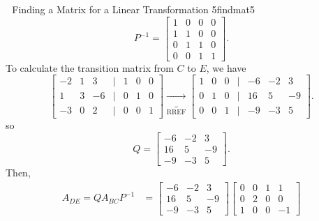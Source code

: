 \begin{example}{\Difficulty\,\Difficulty\,\Difficulty\,\,Finding a Matrix for a Linear Transformation 5}{findmat5}
\begin{equation*}
                P^{-1}=\begin{bmatrix}
                    1 & 0 & 0 & 0 \\
                    1 & 1 & 0 & 0 \\
                    0 & 1 & 1 & 0 \\
                    0 & 0 & 1 & 1
                \end{bmatrix}.
            \end{equation*}
            To calculate the transition matrix from \(C\) to \(E\), we have
            \begin{equation*}
                \begin{bmatrix}
                    -2 & 1 & 3 & | & 1 & 0 & 0 \\
                    1 & 3 & -6 & | & 0 & 1 & 0 \\
                    -3 & 0 & 2 & | & 0 & 0 & 1
                \end{bmatrix}\underbrace{\to}_\text{RREF}\begin{bmatrix}
                    1 & 0 & 0 & | & -6 & -2 & 3 \\
                    0 & 1 & 0 & | & 16 & 5 & -9 \\
                    0 & 0 & 1 & | & -9 & -3 & 5
                \end{bmatrix}.
            \end{equation*}
            so
            \begin{equation*}
                Q=\begin{bmatrix}
                    -6 & -2 & 3 \\
                    16 & 5 & -9 \\
                    -9 & -3 & 5
                \end{bmatrix}.
            \end{equation*}
            Then,
            \begin{align*}
                A_{DE}=QA_{BC}P^{-1}&=\begin{bmatrix}
                    -6 & -2 & 3 \\
                    16 & 5 & -9 \\
                    -9 & -3 & 5
                \end{bmatrix}\begin{bmatrix}
                    0 & 0 & 1 & 1 \\
                    0 & 2 & 0 & 0 \\
                    1 & 0 & 0 & -1

\end{bmatrix}
\end{align*}
\end{example}
